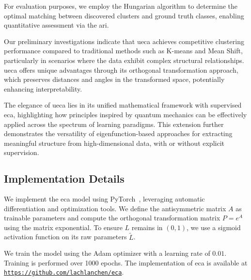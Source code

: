\documentclass[lettersize,journal]{IEEEtran}
\begin{document}

For evaluation purposes, we employ the Hungarian algorithm to determine the optimal matching between discovered clusters and ground truth classes, enabling quantitative assessment via the \gls{ari}.



Our preliminary investigations indicate that \gls{ueca} achieves competitive clustering performance compared to traditional methods such as K-means and Mean Shift, particularly in scenarios where the data exhibit complex structural relationships. 
\Gls{ueca} offers unique advantages through its orthogonal transformation approach, which preserves distances and angles in the transformed space, potentially enhancing interpretability.

The elegance of \gls{ueca} lies in its unified mathematical framework with supervised \gls{eca}, highlighting how principles inspired by quantum mechanics can be effectively applied across the spectrum of learning paradigms. This extension further demonstrates the versatility of eigenfunction-based approaches for extracting meaningful structure from high-dimensional data, with or without explicit supervision.

\subsection{Implementation Details}

We implement the \Gls{eca} model using PyTorch~\cite{baydin2018automatic}, leveraging automatic differentiation and optimization tools. We define the antisymmetric matrix \( A \) as trainable parameters and compute the orthogonal transformation matrix \( P = e^{A} \) using the matrix exponential. To ensure \( L \) remains in \( (0, 1) \), we use a sigmoid activation function on its raw parameters \( \tilde{L} \).

We train the model using the Adam optimizer with a learning rate of \( 0.01 \).
Training is performed over 1000 epochs.
The implementation of \gls{eca} is available at 
\href{https://github.com/lachlanchen/eca}{\texttt{https://github.com/lachlanchen/eca}}.
\end{document}
